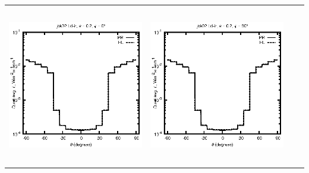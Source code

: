 \documentclass[10pt,a4paper]{article}
\begin{document}
\begin{adjustwidth}{-1.2in}{-1.2in}
\begin{tabular}{c c c c}
\includegraphics[height=7cm]{../eps/jok02_Ld_ir_fwd.eps} &
\includegraphics[height=7cm]{../eps/jok02_Ld_ir_cross.eps} \\
\end{tabular}

\pagebreak


\end{adjustwidth}
\end{document}
